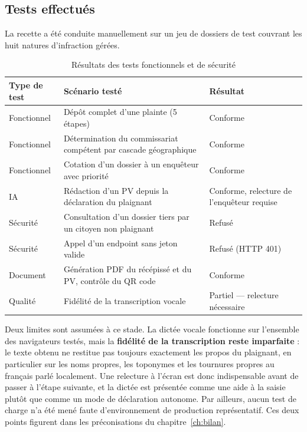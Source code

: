 \subsection{Tests effectués}

La recette a été conduite manuellement sur un jeu de dossiers de test couvrant les huit natures d'infraction gérées.

\begin{table}[H]
    \centering
    \begin{tabularx}{\textwidth}{|l|>{\raggedright\arraybackslash}X|l|}
        \hline
        \textbf{Type de test} & \textbf{Scénario testé} & \textbf{Résultat} \\
        \hline
        Fonctionnel & Dépôt complet d'une plainte (5 étapes) & Conforme \\
        \hline
        Fonctionnel & Détermination du commissariat compétent par cascade géographique & Conforme \\
        \hline
        Fonctionnel & Cotation d'un dossier à un enquêteur avec priorité & Conforme \\
        \hline
        IA & Rédaction d'un PV depuis la déclaration du plaignant & Conforme, relecture de l'enquêteur requise \\
        \hline
        Sécurité & Consultation d'un dossier tiers par un citoyen non plaignant & Refusé \\
        \hline
        Sécurité & Appel d'un endpoint sans jeton valide & Refusé (HTTP 401) \\
        \hline
        Document & Génération PDF du récépissé et du PV, contrôle du QR code & Conforme \\
        \hline
        Qualité & Fidélité de la transcription vocale & Partiel — relecture nécessaire \\
        \hline
    \end{tabularx}
    \caption{Résultats des tests fonctionnels et de sécurité}
    \label{tab:tests}
\end{table}

Deux limites sont assumées à ce stade. La dictée vocale fonctionne sur l'ensemble des navigateurs testés, mais la \textbf{fidélité de la transcription reste imparfaite} : le texte obtenu ne restitue pas toujours exactement les propos du plaignant, en particulier sur les noms propres, les toponymes et les tournures propres au français parlé localement. Une relecture à l'écran est donc indispensable avant de passer à l'étape suivante, et la dictée est présentée comme une aide à la saisie plutôt que comme un mode de déclaration autonome. Par ailleurs, aucun test de charge n'a été mené faute d'environnement de production représentatif. Ces deux points figurent dans les préconisations du chapitre~\ref{ch:bilan}.
